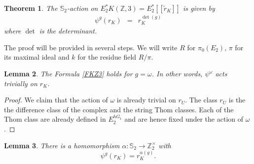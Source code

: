 \documentclass{amsart}
\renewcommand{\S}{{\mathbb S}}
\newcommand {\Z}{{\mathbb Z}}
\newcommand{\lra}{\longrightarrow}              %
\numberwithin{equation}{section}
\newtheorem{thm}{Theorem}[section]
\newtheorem{lemma}[thm]{Lemma}
\theoremstyle{definition}  %
\newtheorem{set theory}[thm]{Set Theoretic Prelude}
\begin{document}
\begin{thm} \label{action K}The $\S_2$-action on
$E_2^*K(\Z,3)= E_2^*[\! [\tilde{r}_K]\! ] $
is given by 
\begin{eqnarray}\label{FKZ3}
\psi^g (r_K) & = &r_K^{\det(g)}
\end{eqnarray}
where $\det$ is the determinant. 

\end{thm}
The proof will be provided in several steps. We will write $R$ for $\pi_0(E_2)$, $\pi$ for its maximal ideal and $k$ for the residue field $R/\pi$.
\begin{lemma}\label{Omegaact}
The Formula \ref{FKZ3} holds for $g=\omega$. In other words, $\psi^\omega$ acts trivially on $r_K$.
\end{lemma}
 \begin{proof}
We claim that the action of $\omega$ is already trivial on $r_U$. The class $r_U$ is the  the difference class of the complex and the string Thom classes. Each of the Thom class are already defined  in $E_2^{hG_1}$ and are hence fixed under the action of $\omega$.

\end{proof}
\begin{lemma}
There is a homomorphism $\alpha: \S_2 \lra \Z_2^\times$ with 
$$\psi^g (r_K) = r_K^{\alpha(g)}.$$
\end{lemma}
\end{document}
